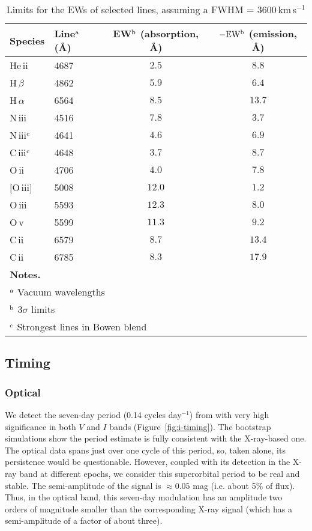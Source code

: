 \documentclass[a4paper,fleqn,usenatbib]{mnras}
\begin{document}
\begin{table}
	\centering
	\caption{Limits for the EWs of selected lines, assuming a FWHM = 3600\,km\,s$^{-1}$}
	\begin{tabular}{llcc}
	\hline
	Species & \shortstack{Line$^{\rm a}$\\(\AA)} & \shortstack{EW$^{\rm b}$ \\(absorption, \AA)} & \shortstack{$\rm -EW^{\rm b}$\\(emission, \AA)}\\
	\hline
	\hline
He\,{\sc ii} & 4687 & $2.5$ & $8.8$ \\
H\,$\beta$ & 4862 & $5.9$ & $6.4$ \\
H\,$\alpha$ & 6564 & $8.5$ & $13.7$ \\
\hline
N\,{\sc iii} & 4516 & $7.8$ & $3.7$ \\
N\,{\sc iii}$^{\rm c}$ & 4641 & $4.6$ & $6.9$ \\
C\,{\sc iii}$^{\rm c}$ & 4648 & $3.7$ & $8.7$ \\
O\,{\sc ii} & 4706 & $4.0$ & $7.8$ \\
$[$O\,{\sc iii}$]$ & 5008 & $12.0$ & $1.2$ \\
O\,{\sc iii} & 5593 & $12.3$ & $8.0$ \\
O\,{\sc v} & 5599 & $11.3$ & $9.2$ \\
C\,{\sc ii} & 6579 & $8.7$ & $13.4$ \\
C\,{\sc ii} & 6785 & $8.3$ & $17.9$ \\
	\hline
	\multicolumn{3}{l}{\bf Notes.} \\
	\multicolumn{3}{l}{$^{\rm a}$ Vacuum wavelengths}\\
	\multicolumn{3}{l}{$^{\rm b}$ 3$\sigma$ limits}\\
	\multicolumn{3}{l}{$^{\rm c}$ Strongest lines in Bowen blend}
	\end{tabular}
	\label{tab:ew}
\end{table}

\subsection{Timing}

\subsubsection{Optical}
\label{sec:timing}
We detect the seven-day period (0.14 cycles day$^{-1}$) from \citet{2017MNRAS.467.2199B} with very high significance in both $V$ and $I$ bands (Figure~\ref{fig:i-timing}). The bootstrap simulations show the period estimate is fully consistent with the X-ray-based one. The optical data spans just over one cycle of this period, so, taken alone, its persistence would be questionable. However, coupled with its detection in the X-ray band at different epochs, we consider this superorbital period to be real and stable. The semi-amplitude of the signal is $\approx 0.05$ mag (i.e. about 5\% of flux). Thus, in the optical band, this seven-day modulation has an amplitude two orders of magnitude smaller than the corresponding X-ray signal (which has a semi-amplitude of a factor of about three).
\end{document}
